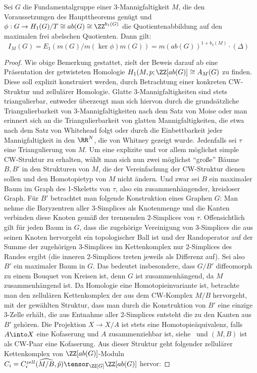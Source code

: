 \begin{thm}
\label{thm:keralexnorm}
	Sei $G$ die Fundamentalgruppe einer 3-Mannigfaltigkeit $M$, die den Voraussetzungen des Haupttheorems genügt und $\phi:G \to H_1(G)/T \cong ab(G) \cong \ZZ^{b_1(G)}$ die Quotientenabbildung auf den maximalen frei abelschen Quotienten. Dann gilt:
	\[
		I_M(G)=E_1(m(G)/m(\ker\phi)m(G)) = m(ab(G))^{1+b_3(M)}\cdot (\Delta) 
	\]
\end{thm}
\begin{proof}
	Wie obige Bemerkung gestattet, zielt der Beweis darauf ab eine Präsentation der getwisteten Homologie $H_1(M,p;\ZZ[ab(G)]\cong A_M(G)$ zu finden. Diese soll explizit konstruiert werden, durch Betrachtung einer konkreten CW-Struktur und zellulärer Homologie. Glatte 3-Mannigfaltigkeiten sind stets triangulierbar, entweder überzeugt man sich hiervon durch die grundsätzliche Triangulierbarkeit von 3-Mannigfaltigkeiten nach dem Satz von Moise oder man erinnert sich an die Triangulierbarkeit von glatten Mannigfaltigkeiten, die etwa nach dem Satz von Whitehead folgt oder durch die Einbettbarkeit jeder Mannigfaltigkeit in den $\RR^N$, die von Whitney gezeigt wurde. Jedenfalls sei $\tau$ eine Triangulierung von $M$. Um eine explizite und vor allem möglichst simple CW-Struktur zu erhalten, wählt man sich nun zwei möglichst "`große"' Bäume $B,B'$ in den Strukturen von $M$, die der Vereinfachung der CW-Struktur dienen sollen und den Homotopietyp von $M$ nicht ändern. Und zwar sei $B$ ein maximaler Baum im Graph des 1-Skeletts von $\tau$, also ein zusammenhängender, kreisloser Graph. Für $B'$ betrachtet man folgende Konstruktion eines Graphen $G$: Man nehme die Baryzentren aller $3$-Simplices als Knotenmenge und die Kanten verbinden diese Knoten gemäß der trennenden $2$-Simplices von $\tau$. Offensichtlich gilt für jeden Baum in $G$, dass die zugehörige Vereinigung von $3$-Simplices die aus seinen Knoten hervorgeht ein topologischer Ball ist und der Randoperator auf der Summe der zugehörigen 3-Simplices im Kettenkomplex nur 2-Simplices des Randes ergibt (die inneren 2-Simplices treten jeweils als Differenz auf). Sei also $B'$ ein maximaler Baum in $G$. Das bedeutet insbesondere, dass $G/B'$ diffeomorph zu einem Bouquet von Kreisen ist, denn $G$ ist zusammenhängend, da $M$ zusammenhängend ist. Da Homologie eine Homotopieinvariante ist, betrachte man den zellulären Kettenkomplex der aus dem CW-Komplex $M/B$ hervorgeht, mit der gewählten Struktur, dass man durch die Konstruktion von $B'$ eine einzige 3-Zelle erhält, die aus Entnahme aller 2-Simplices entsteht die zu den Kanten aus $B'$ gehören. Die Projektion $X \to X/A$ ist stets eine Homotopieäquivalenz, falls $A\into X$ eine Kofaserung und $A$ zusammenziehbar ist, siehe~\cite[Kapitel 1, Corollar 5.13]{Whitehead.1995} und $(M,B)$ ist als CW-Paar eine Kofaserung. Aus dieser Struktur geht folgender zellulärer Kettenkomplex von $\ZZ[ab(G)]$-Moduln $C_i=C_i^{zell}(\widehat{M/B},\hat p)\tensor_{\ZZ[G]}\ZZ[ab(G)]$ hervor:

\end{proof}
